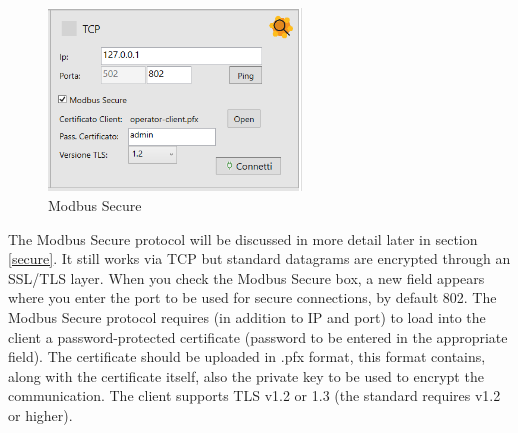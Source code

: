 \begin{figure}[H]
\centering
\includegraphics[width=0.6\textwidth]{../Img/ModBus_Home_Secure.PNG}
\caption[Modbus Secure]{Modbus Secure}
\end{figure}

The Modbus Secure protocol will be discussed in more detail later in section
\ref{secure}. It still works via TCP but standard datagrams are
encrypted through an SSL/TLS layer. When you check
the Modbus Secure box, a new field appears where you enter the port to be used
for secure connections, by default 802.
The Modbus Secure protocol requires (in addition to IP and port)
to load into the client
a password-protected certificate (password to be entered in the appropriate field).
The certificate should be uploaded in .pfx format, this
format contains, along with the certificate itself, also 
the private key to be used to encrypt the communication.
The client supports TLS v1.2 or 1.3 (the standard requires v1.2 or higher).
